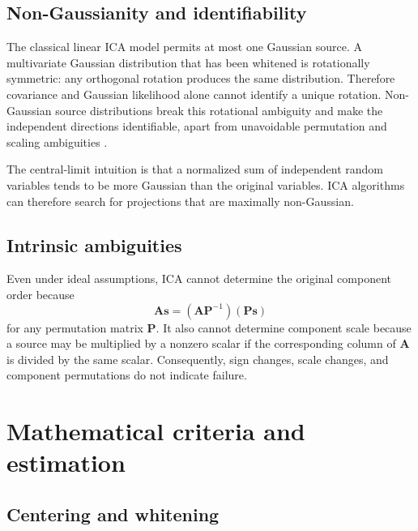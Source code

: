 \documentclass[
    paper=a4,
    fontsize=11pt,
    DIV=11,
    parskip=half,
    headings=normal,
    numbers=noendperiod,
    abstract=true,
    titlepage=true
]{scrartcl}
\begin{document}
\subsection{Non-Gaussianity and identifiability}

The classical linear ICA model permits at most one Gaussian source. A multivariate Gaussian distribution that has been whitened is rotationally symmetric: any orthogonal rotation produces the same distribution. Therefore covariance and Gaussian likelihood alone cannot identify a unique rotation. Non-Gaussian source distributions break this rotational ambiguity and make the independent directions identifiable, apart from unavoidable permutation and scaling ambiguities \cite{hyvarinenbook}.

The central-limit intuition is that a normalized sum of independent random variables tends to be more Gaussian than the original variables. ICA algorithms can therefore search for projections that are maximally non-Gaussian.

\subsection{Intrinsic ambiguities}

Even under ideal assumptions, ICA cannot determine the original component order because
\begin{equation}
    \mathbf{A}\mathbf{s}=(\mathbf{A}\mathbf{P}^{-1})(\mathbf{P}\mathbf{s})
\end{equation}
for any permutation matrix $\mathbf{P}$. It also cannot determine component scale because a source may be multiplied by a nonzero scalar if the corresponding column of $\mathbf{A}$ is divided by the same scalar. Consequently, sign changes, scale changes, and component permutations do not indicate failure.

\section{Mathematical criteria and estimation}

\subsection{Centering and whitening}
\end{document}
